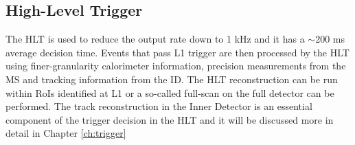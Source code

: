 		\subsection{High-Level Trigger}

			The HLT is used to reduce the output rate down to 1 kHz and it has a $\sim$200 ms average decision time. Events that pass L1 trigger are then processed by the HLT using finer-granularity calorimeter information, precision measurements from the MS and tracking information from the ID. The HLT reconstruction can be run within RoIs identified at L1 or a so-called full-scan on the full detector can be performed. The track reconstruction in the Inner Detector is an essential component of the trigger decision in the HLT and it will be discussed more in detail in Chapter \ref{ch:trigger}







